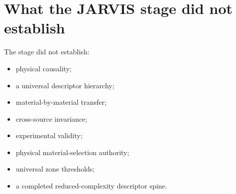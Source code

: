 \documentclass[11pt,a4paper,oneside]{report}
\begin{document}
\section{What the JARVIS stage did not establish}



The stage did not establish:



\begin{itemize}



\item

physical causality;



\item

a universal descriptor hierarchy;



\item

material-by-material transfer;



\item

cross-source invariance;



\item

experimental validity;



\item

physical material-selection authority;



\item

universal zone thresholds;



\item

a completed reduced-complexity descriptor spine.



\end{itemize}
\end{document}
